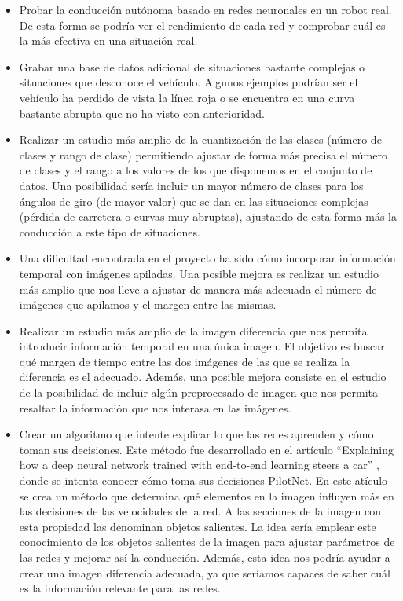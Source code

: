 \begin{itemize}

    \item Probar la conducción autónoma basado en redes neuronales en un robot real. De esta forma se podría ver el rendimiento de cada red y comprobar cuál es la más efectiva en una situación real.
    
    \item Grabar una base de datos adicional de situaciones bastante complejas o situaciones que desconoce el vehículo. Algunos ejemplos podrían ser el vehículo ha perdido de vista la línea roja o se encuentra en una curva bastante abrupta que no ha visto con anterioridad. 
    
    \item Realizar un estudio más amplio de la cuantización de las clases (número de clases y rango de clase) permitiendo ajustar de forma más precisa el número de clases y el rango a los valores de los que disponemos en el conjunto de datos. Una posibilidad sería incluir un mayor número de clases para los ángulos de giro (de mayor valor) que se dan en las situaciones complejas (pérdida de carretera o curvas muy abruptas), ajustando de esta  forma más la conducción a este tipo de situaciones.
    
    \item Una dificultad encontrada en el proyecto ha sido cómo incorporar información temporal con imágenes apiladas. Una posible mejora es realizar un estudio más amplio que nos lleve a ajustar de manera más adecuada el número de imágenes que apilamos y el margen entre las mismas.
    
    \item Realizar un estudio más amplio de la imagen diferencia que nos permita introducir información temporal en una única imagen. El objetivo es buscar qué margen de tiempo entre las dos imágenes de las que se realiza la diferencia es el adecuado. Además, una posible mejora consiste en el estudio de la posibilidad de incluir algún preprocesado de imagen que nos permita resaltar la información que nos interasa en las imágenes.
    
    \item Crear un algoritmo que intente explicar lo que las redes aprenden y cómo toman sus decisiones. Este método fue desarrollado en el artículo ``Explaining  how  a  deep  neural network trained with end-to-end learning steers a car'' \cite{explaining-end2end} \cite{visual}, donde se intenta conocer cómo toma sus decisiones PilotNet. En este atículo se crea un método que determina qué elementos en la imagen influyen más en las decisiones de las velocidades de la red. A las secciones de la imagen con esta propiedad las denominan objetos salientes. La idea sería emplear este conocimiento de los objetos salientes de la imagen para ajustar parámetros de las redes y mejorar así la conducción. Además, esta idea nos podría ayudar a crear una imagen diferencia adecuada, ya que seríamos capaces de saber cuál es la información relevante para las redes.
\end{itemize}

